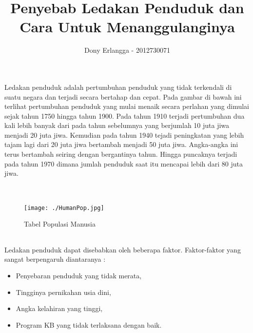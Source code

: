 \documentclass[11pt,a4paper]{report}
\begin{document}
	\title {Penyebab Ledakan Penduduk dan Cara Untuk Menanggulanginya}
	\author {Dony Erlangga - 2012730071}
	\date{} \maketitle
	Ledakan penduduk adalah pertumbuhan penduduk yang tidak terkendali di suatu negara dan terjadi secara bertahap dan cepat. Pada gambar di bawah ini terlihat pertumbuhan penduduk yang mulai menaik secara perlahan yang dimulai sejak tahun 1750 hingga tahun 1900. Pada tahun 1910 terjadi pertumbuhan dua kali lebih banyak dari pada tahun sebelumnya yang berjumlah 10 juta jiwa menjadi 20 juta jiwa. Kemudian pada tahun 1940 tejadi peningkatan yang lebih tajam lagi dari 20 juta jiwa bertambah menjadi 50 juta jiwa. Angka-angka ini terus bertambah seiring dengan bergantinya tahun. Hingga puncaknya terjadi pada tahun 1970 dimana jumlah penduduk saat itu mencapai lebih dari 80 juta jiwa.\\\\\	
	\begin{figure}[htbp]
		\centering
			\texttt{[image: ./HumanPop.jpg]}
			\caption{Tabel Populasi Manusia}
			\label{Gambar 1 : Tabel Populasi Manusia}
	\end{figure}
	\\
	Ledakan penduduk dapat disebabkan oleh beberapa faktor. Faktor-faktor yang sangat berpengaruh diantaranya : 
	\begin{itemize}
		\item Penyebaran penduduk yang tidak merata,
		\item Tingginya pernikahan usia dini,
		\item Angka kelahiran yang tinggi,
		\item Program KB yang tidak terlaksana dengan baik.
	\end{itemize}
	
\end{document}

